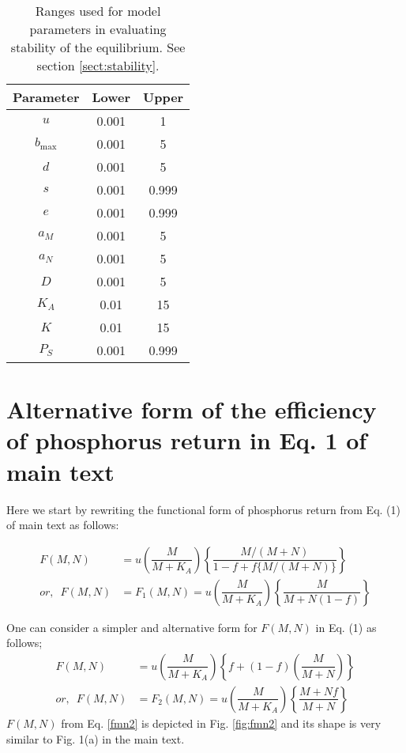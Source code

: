 \documentclass[letterpaper,11pt]{article}
\newcommand{\bmax}{b_{\text{max}}}
\begin{document}
\begin{table}
\begin{center}
\caption{Ranges used for model parameters in evaluating stability of the equilibrium. See section \ref{sect:stability}.}
\label{tab:paramranges}
\begin{tabular}{ccc}
\hline
\textbf{Parameter} & \textbf{Lower} & \textbf{Upper} \\
\hline
$u$ & 0.001 & 1 \\
$\bmax$ & 0.001 & 5 \\
$d$ & 0.001 & 5 \\
$s$ & 0.001 & 0.999 \\
$e$ & 0.001 & 0.999 \\
$a_M$ & 0.001 & 5 \\
$a_N$ & 0.001 & 5 \\
$D$ & 0.001 & 5 \\
$K_A$ & 0.01 & 15 \\
$K$ & 0.01 & 15 \\
$P_S$ & 0.001 & 0.999 \\ 
\hline
\end{tabular}
\end{center}
\end{table}

\section{Alternative form of the efficiency of phosphorus return in Eq. 1 of main text}\label{sect:altmodel}

Here we start by rewriting the functional form of phosphorus return from Eq. (1) of main text as follows:

\begin{align}
F(M,N) &= u \left( \dfrac{M}{M+K_{A}}\right) \left\lbrace  \dfrac{M/(M+N)}{1-f+f\lbrace M/(M+N)\rbrace }\right\rbrace\\
or,\;\ F(M,N) &= F_{1}(M,N) = u \left( \dfrac{M}{M+K_{A}}\right) \left\lbrace \dfrac{M}{M+N(1-f)} \right\rbrace   \label{fmn1}
\end{align}


One can consider a simpler and alternative form for $F(M,N)$ in Eq. (1) as follows;
\begin{align}
F(M,N) &= u \left( \dfrac{M}{M+K_{A}}\right) \left\lbrace f+(1-f)\left( \dfrac{M}{M+N}\right) \right\rbrace \\
or,\;\ F(M,N) &= F_{2}(M,N) = u \left( \dfrac{M}{M+K_{A}}\right) \left\lbrace \dfrac{M+Nf}{M+N} \right\rbrace  \label{fmn2}
\end{align}
$F(M,N)$ from Eq. \ref{fmn2} is depicted in Fig. \ref{fig:fmn2} and its shape is very similar to Fig. 1(a) in the main text.
\end{document}
